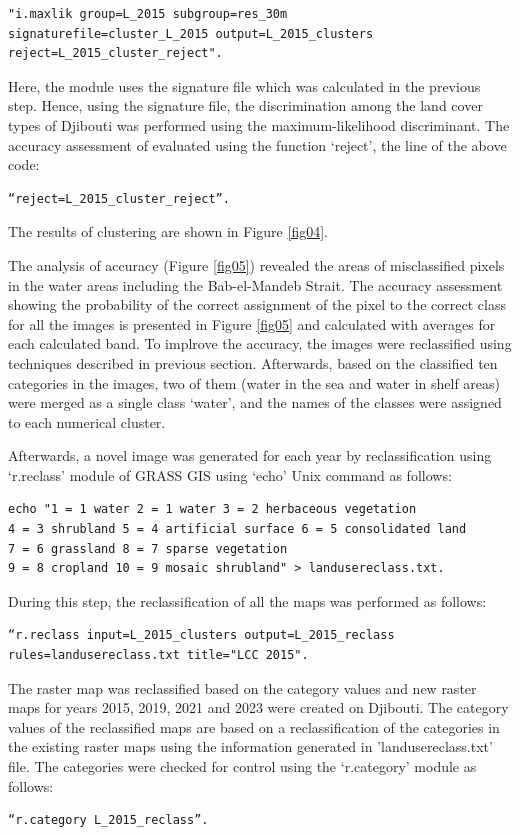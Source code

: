 \documentclass[jimaging,article,submit,pdftex,moreauthors]{Definitions/mdpi}
\begin{document}
\begin{verbatim}
"i.maxlik group=L_2015 subgroup=res_30m 
signaturefile=cluster_L_2015 output=L_2015_clusters 
reject=L_2015_cluster_reject".
\end{verbatim}
 Here, the module uses the signature file which was calculated in the previous step. Hence, using the signature file, the discrimination among the land cover types of Djibouti was performed using the maximum-likelihood discriminant. The accuracy assessment of evaluated using the function ‘reject’, the line of the above code: 
 \begin{verbatim}
“reject=L_2015_cluster_reject”.
\end{verbatim}

 The results of clustering are shown in Figure \ref{fig04}.
 
The analysis of accuracy (Figure \ref{fig05}) revealed the areas of misclassified pixels in the water areas including the Bab-el-Mandeb Strait. The accuracy assessment showing the probability of the correct assignment of the pixel to the correct class for all the images is presented in Figure \ref{fig05} and calculated with averages for each calculated band. To implrove the accuracy, the images were reclassified using techniques described in previous section. Afterwards, based on the classified ten categories in the images, two of them (water in the sea and water in shelf areas) were merged as a single class ‘water’, and the names of the classes were assigned to each numerical cluster. 

Afterwards, a novel image was generated for each year by reclassification using ‘r.reclass’ module of GRASS GIS using ‘echo’ Unix command as follows: 
 \begin{verbatim}
echo "1 = 1 water 2 = 1 water 3 = 2 herbaceous vegetation 
4 = 3 shrubland 5 = 4 artificial surface 6 = 5 consolidated land 
7 = 6 grassland 8 = 7 sparse vegetation 
9 = 8 cropland 10 = 9 mosaic shrubland" > landusereclass.txt. 
\end{verbatim}
During this step, the reclassification of all the maps was performed as follows: 

 \begin{verbatim}
“r.reclass input=L_2015_clusters output=L_2015_reclass 
rules=landusereclass.txt title="LCC 2015".
\end{verbatim}

 The raster map was reclassified based on the category values and new raster maps for years 2015, 2019, 2021 and 2023 were created on Djibouti. The category values of the reclassified maps are based on a reclassification of the categories in the existing raster maps using the information generated in 'landusereclass.txt' file. The categories were checked for control using the ‘r.category’ module as follows: 
 \begin{verbatim}
“r.category L_2015_reclass”.
\end{verbatim}
\end{document}
